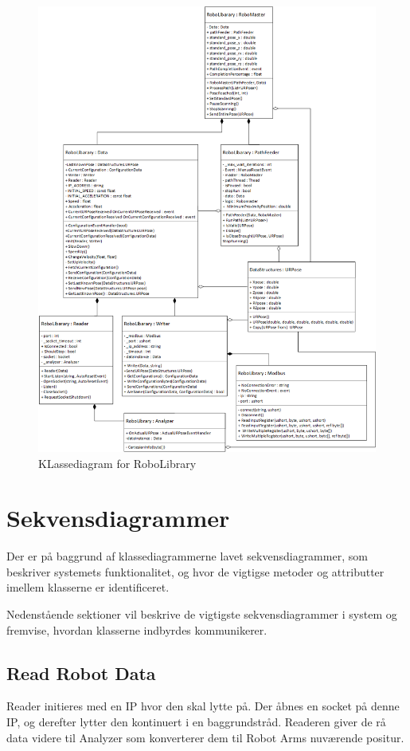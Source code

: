 \begin{figure}[H]
    \centering
    \includegraphics[width=1\textwidth]{figurer/d/Design/Class/uml_class_robolibrary}
    \caption{KLassediagram for RoboLibrary}
    \label{class_RoboLib}
\end{figure}

\newpage
\section{Sekvensdiagrammer}
Der er på baggrund af klassediagrammerne lavet sekvensdiagrammer, som beskriver systemets funktionalitet, og hvor de vigtigse metoder og attributter imellem klasserne er identificeret.

Nedenstående sektioner vil beskrive de vigtigste sekvensdiagrammer i system og fremvise, hvordan klasserne indbyrdes kommunikerer. 

\subsection{Read Robot Data} 
Reader initieres med en IP hvor den skal lytte på. 
Der åbnes en socket på denne IP, og derefter lytter den kontinuert i en baggrundstråd. 
Readeren giver de rå data videre til Analyzer som konverterer dem til Robot Arms nuværende positur.


